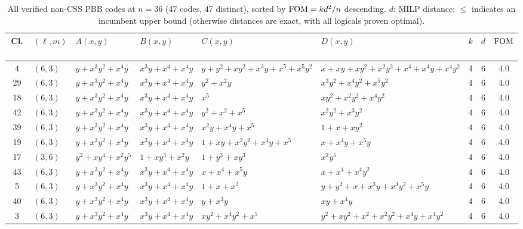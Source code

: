 \begin{table}[t]
\centering
\caption{All verified non-CSS PBB codes at $n = 36$ (47 codes, 47 distinct), sorted by $\mathrm{FOM} = kd^2/n$ descending.
$d$: MILP distance; $\leq$ indicates an incumbent upper bound (otherwise distances are exact, with all logicals proven optimal).}
\label{tab:pbb_cat36}
\tiny
\renewcommand{\arraystretch}{0.82}
\setlength{\tabcolsep}{1.5pt}
\begin{tabular*}{\textwidth}{@{\extracolsep{\fill}}cllllllcc}
\toprule
Cl.\ & $(\ell,m)$ & $A(x,y)$ & $B(x,y)$ & $C(x,y)$ & $D(x,y)$ & $k$ & $d$ & $\mathrm{FOM}$ \\
\midrule
4 & $(6,3)$ & $y{+}x^{3}y^{2}{+}x^{4}y$ & $x^{3}y{+}x^{4}{+}x^{4}y$ & $y{+}y^{2}{+}xy^{2}{+}x^{3}y{+}x^{5}{+}x^{5}y^{2}$ & $x{+}xy{+}xy^{2}{+}x^{2}y^{2}{+}x^{4}{+}x^{4}y{+}x^{4}y^{2}$ & 4 & 6 & 4.0 \\
29 & $(6,3)$ & $y{+}x^{3}y^{2}{+}x^{4}y$ & $x^{3}y{+}x^{4}{+}x^{4}y$ & $y^{2}{+}x^{2}y$ & $x^{3}y^{2}{+}x^{4}y^{2}{+}x^{5}y^{2}$ & 4 & 6 & 4.0 \\
18 & $(6,3)$ & $y{+}x^{3}y^{2}{+}x^{4}y$ & $x^{3}y{+}x^{4}{+}x^{4}y$ & $x^{5}$ & $xy^{2}{+}x^{2}y^{2}{+}x^{4}y^{2}$ & 4 & 6 & 4.0 \\
42 & $(6,3)$ & $y{+}x^{3}y^{2}{+}x^{4}y$ & $x^{3}y{+}x^{4}{+}x^{4}y$ & $y^{2}{+}x^{2}{+}x^{5}$ & $x^{2}y^{2}{+}x^{3}y^{2}$ & 4 & 6 & 4.0 \\
39 & $(6,3)$ & $y{+}x^{3}y^{2}{+}x^{4}y$ & $x^{3}y{+}x^{4}{+}x^{4}y$ & $x^{2}y{+}x^{4}y{+}x^{5}$ & $1{+}x{+}xy^{2}$ & 4 & 6 & 4.0 \\
19 & $(6,3)$ & $y{+}x^{3}y^{2}{+}x^{4}y$ & $x^{3}y{+}x^{4}{+}x^{4}y$ & $1{+}xy{+}x^{2}y^{2}{+}x^{4}y{+}x^{5}$ & $x{+}x^{4}y{+}x^{5}y$ & 4 & 6 & 4.0 \\
17 & $(3,6)$ & $y^{2}{+}xy^{4}{+}x^{2}y^{5}$ & $1{+}xy^{3}{+}x^{2}y$ & $1{+}y^{3}{+}xy^{3}$ & $x^{2}y^{5}$ & 4 & 6 & 4.0 \\
43 & $(6,3)$ & $y{+}x^{3}y^{2}{+}x^{4}y$ & $x^{3}y{+}x^{4}{+}x^{4}y$ & $x{+}x^{4}{+}x^{5}y$ & $x{+}x^{4}{+}x^{4}y^{2}$ & 4 & 6 & 4.0 \\
5 & $(6,3)$ & $y{+}x^{3}y^{2}{+}x^{4}y$ & $x^{3}y{+}x^{4}{+}x^{4}y$ & $1{+}x{+}x^{2}$ & $y{+}y^{2}{+}x{+}x^{3}y{+}x^{3}y^{2}{+}x^{5}y$ & 4 & 6 & 4.0 \\
40 & $(6,3)$ & $y{+}x^{3}y^{2}{+}x^{4}y$ & $x^{3}y{+}x^{4}{+}x^{4}y$ & $y{+}x^{3}y$ & $xy{+}x^{4}y$ & 4 & 6 & 4.0 \\
3 & $(6,3)$ & $y{+}x^{3}y^{2}{+}x^{4}y$ & $x^{3}y{+}x^{4}{+}x^{4}y$ & $xy^{2}{+}x^{4}y^{2}{+}x^{5}$ & $y^{2}{+}xy^{2}{+}x^{2}{+}x^{2}y^{2}{+}x^{4}y{+}x^{4}y^{2}$ & 4 & 6 & 4.0 \\

\end{tabular*}
\end{table}

